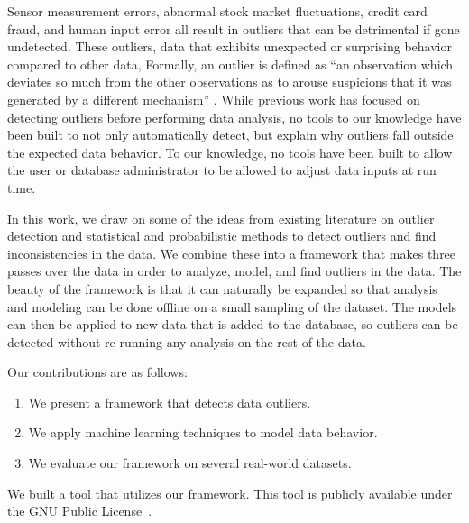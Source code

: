 
Sensor measurement errors, abnormal stock market fluctuations, credit card fraud, and human input error all result in outliers that can be detrimental if gone undetected.
These outliers, data that exhibits unexpected or surprising behavior compared to other data, 
Formally, an outlier is defined as “an observation which deviates so much from the other observations as to arouse suspicions that it was generated by a different mechanism” \cite{Hawkins1980}.
While previous work has focused on detecting outliers before performing data analysis, no tools to our knowledge have been built to not only automatically detect, but explain why outliers fall outside the expected data behavior.
To our knowledge, no tools have been built to allow the user or database administrator to be allowed to adjust data inputs at run time.


In this work, we draw on some of the ideas from existing literature on outlier detection and statistical and probabilistic methods to detect outliers and find inconsistencies in the data.
We combine these into a framework that makes three passes over the data in order to analyze, model, and find outliers in the data.
The beauty of the framework is that it can naturally be expanded so that analysis and modeling can be done offline on a small sampling of the dataset.
The models can then be applied to new data that is added to the database, so outliers can be detected without re-running any analysis on the rest of the data.

Our contributions are as follows:
\begin{enumerate}
\item We present a framework that detects data outliers.
\item We apply machine learning techniques to model data behavior.
\item We evaluate our framework on several real-world datasets.
\end{enumerate}

We built a tool that utilizes our framework.
This tool is publicly available under the GNU Public License~\cite{github}.
